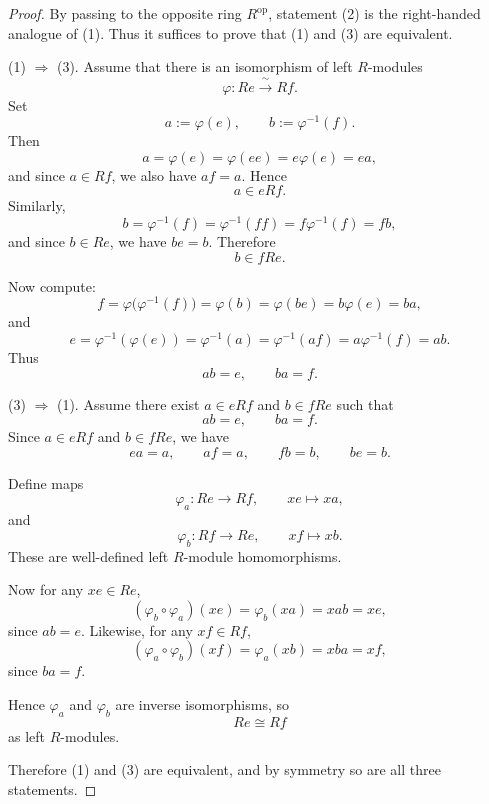 \begin{proof}
    By passing to the opposite ring $R^{\operatorname{op}}$, statement \textup{(2)} is the right-handed analogue of \textup{(1)}. Thus it suffices to prove that \textup{(1)} and \textup{(3)} are equivalent.

    \medskip

    \noindent
    \textup{(1) $\Rightarrow$ (3).}
    Assume that there is an isomorphism of left $R$-modules
    \[
        \varphi: Re \xrightarrow{\;\sim\;} Rf.
    \]
    Set
    \[
        a:=\varphi(e), \qquad b:=\varphi^{-1}(f).
    \]
    Then
    \[
        a=\varphi(e)=\varphi(ee)=e\varphi(e)=ea,
    \]
    and since $a\in Rf$, we also have $af=a$. Hence
    \[
        a\in eRf.
    \]
    Similarly,
    \[
        b=\varphi^{-1}(f)=\varphi^{-1}(ff)=f\varphi^{-1}(f)=fb,
    \]
    and since $b\in Re$, we have $be=b$. Therefore
    \[
        b\in fRe.
    \]

    Now compute:
    \[
        f=\varphi\bigl(\varphi^{-1}(f)\bigr)=\varphi(b)=\varphi(be)=b\varphi(e)=ba,
    \]
    and
    \[
        e=\varphi^{-1}(\varphi(e))=\varphi^{-1}(a)=\varphi^{-1}(af)=a\varphi^{-1}(f)=ab.
    \]
    Thus
    \[
        ab=e, \qquad ba=f.
    \]

    \medskip

    \noindent
    \textup{(3) $\Rightarrow$ (1).}
    Assume there exist $a\in eRf$ and $b\in fRe$ such that
    \[
        ab=e, \qquad ba=f.
    \]
    Since $a\in eRf$ and $b\in fRe$, we have
    \[
        ea=a, \qquad af=a, \qquad fb=b, \qquad be=b.
    \]

    Define maps
    \[
        \varphi_a: Re \longrightarrow Rf, \qquad xe \longmapsto xa,
    \]
    and
    \[
        \varphi_b: Rf \longrightarrow Re, \qquad xf \longmapsto xb.
    \]
    These are well-defined left $R$-module homomorphisms.

    Now for any $xe\in Re$,
    \[
        (\varphi_b\circ \varphi_a)(xe)=\varphi_b(xa)=xab=xe,
    \]
    since $ab=e$. Likewise, for any $xf\in Rf$,
    \[
        (\varphi_a\circ \varphi_b)(xf)=\varphi_a(xb)=xba=xf,
    \]
    since $ba=f$.

    Hence $\varphi_a$ and $\varphi_b$ are inverse isomorphisms, so
    \[
        Re \cong Rf
    \]
    as left $R$-modules.

    Therefore \textup{(1)} and \textup{(3)} are equivalent, and by symmetry so are all three statements.
\end{proof}

